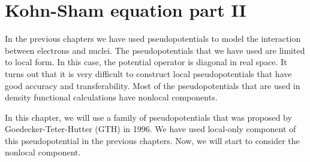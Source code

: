 \chapter{Kohn-Sham equation part II}
\label{chap:ks_part_2}

In the previous chapters we have used pseudopotentials to model the interaction
between electrons and nuclei. The pseudopotentials that we have used
are limited to local form. In this case, the potential operator is diagonal
in real space. It turns out that it is very difficult to construct local pseudopotentials
that have good accuracy and transferability. Most of the pseudopotentials that
are used in density functional calculations have nonlocal components.

In this chapter, we will use a family of pseudopotentials that was
proposed by Goedecker-Teter-Hutter (GTH) \cite{Goedecker1996} in 1996.
We have used local-only component of this pseudopotential in the previous chapters.
Now, we will start to consider the nonlocal component.

